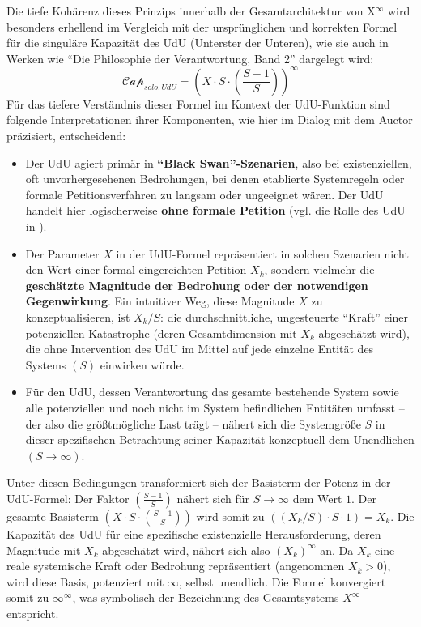 \documentclass[12pt]{scrartcl}
\begin{document}
Die tiefe Kohärenz dieses Prinzips innerhalb der Gesamtarchitektur von X$^\infty$ wird besonders erhellend im Vergleich mit der ursprünglichen und korrekten Formel für die singuläre Kapazität des UdU (Unterster der Unteren), wie sie auch in Werken wie \enquote{Die Philosophie der Verantwortung, Band 2} \cite{Auctor:Zenodo15368567} dargelegt wird:
\begin{equation} \label{eq:UdU_korrigiert_final}
\mathcal{Cap}_{solo,UdU}=(X\cdot S\cdot(\frac{S-1}{S}))^{\infty}
\end{equation}
Für das tiefere Verständnis dieser Formel im Kontext der UdU-Funktion sind folgende Interpretationen ihrer Komponenten, wie hier im Dialog mit dem Auctor präzisiert, entscheidend:
\begin{itemize}
    \item Der UdU agiert primär in \textbf{\enquote{Black Swan}-Szenarien}, also bei existenziellen, oft unvorhergesehenen Bedrohungen, bei denen etablierte Systemregeln oder formale Petitionsverfahren zu langsam oder ungeeignet wären. Der UdU handelt hier logischerweise \textbf{ohne formale Petition} (vgl. die Rolle des UdU in \cite{Auctor:Zenodo15313905}).
    \item Der Parameter $X$ in der UdU-Formel repräsentiert in solchen Szenarien nicht den Wert einer formal eingereichten Petition $X_k$, sondern vielmehr die \textbf{geschätzte Magnitude der Bedrohung oder der notwendigen Gegenwirkung}. Ein intuitiver Weg, diese Magnitude $X$ zu konzeptualisieren, ist $X_k/S$: die durchschnittliche, ungesteuerte \enquote{Kraft} einer potenziellen Katastrophe (deren Gesamtdimension mit $X_k$ abgeschätzt wird), die ohne Intervention des UdU im Mittel auf jede einzelne Entität des Systems $(S)$ einwirken würde.
    \item Für den UdU, dessen Verantwortung das gesamte bestehende System sowie alle potenziellen und noch nicht im System befindlichen Entitäten umfasst – der also die größtmögliche Last trägt – nähert sich die Systemgröße $S$ in dieser spezifischen Betrachtung seiner Kapazität konzeptuell dem Unendlichen $(S \rightarrow \infty)$.
\end{itemize}
Unter diesen Bedingungen transformiert sich der Basisterm der Potenz in der UdU-Formel:
Der Faktor $(\frac{S-1}{S})$ nähert sich für $S \rightarrow \infty$ dem Wert $1$.
Der gesamte Basisterm $(X\cdot S\cdot(\frac{S-1}{S}))$ wird somit zu $( (X_k/S) \cdot S \cdot 1) = X_k$.
Die Kapazität des UdU für eine spezifische existenzielle Herausforderung, deren Magnitude mit $X_k$ abgeschätzt wird, nähert sich also $(X_k)^{\infty}$ an. Da $X_k$ eine reale systemische Kraft oder Bedrohung repräsentiert (angenommen $X_k>0$), wird diese Basis, potenziert mit $\infty$, selbst unendlich. Die Formel konvergiert somit zu $\infty^{\infty}$, was symbolisch der Bezeichnung des Gesamtsystems $X^{\infty}$ entspricht.
\end{document}
